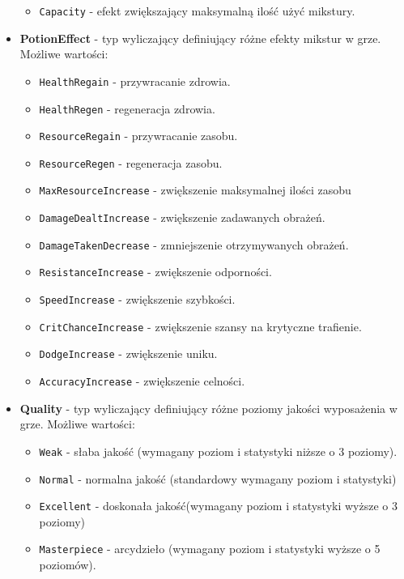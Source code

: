 \begin{itemize}
\begin{itemize}
                \item \texttt{Capacity} - efekt zwiększający maksymalną ilość użyć mikstury.
            \end{itemize}
        \item \textbf{PotionEffect} - typ wyliczający definiujący różne efekty mikstur w grze. 
        Możliwe wartości:
            \begin{itemize}
                \item \texttt{HealthRegain} - przywracanie zdrowia.
                \item \texttt{HealthRegen} - regeneracja zdrowia.
                \item \texttt{ResourceRegain} - przywracanie zasobu.
                \item \texttt{ResourceRegen} - regeneracja zasobu.
                \item \texttt{MaxResourceIncrease} - zwiększenie maksymalnej ilości zasobu
                \item \texttt{DamageDealtIncrease} - zwiększenie zadawanych obrażeń.
                \item \texttt{DamageTakenDecrease} - zmniejszenie otrzymywanych obrażeń.
                \item \texttt{ResistanceIncrease} - zwiększenie odporności.
                \item \texttt{SpeedIncrease} - zwiększenie szybkości.
                \item \texttt{CritChanceIncrease} - zwiększenie szansy na krytyczne trafienie.
                \item \texttt{DodgeIncrease} - zwiększenie uniku.
                \item \texttt{AccuracyIncrease} - zwiększenie celności.
            \end{itemize}
        \item \textbf{Quality} - typ wyliczający definiujący różne poziomy jakości wyposażenia w grze. 
        Możliwe wartości:
            \begin{itemize}
                \item \texttt{Weak} - słaba jakość (wymagany poziom i statystyki niższe o 3 poziomy).
                \item \texttt{Normal} - normalna jakość (standardowy wymagany poziom i statystyki)
                \item \texttt{Excellent} - doskonała jakość(wymagany poziom i statystyki wyższe o 3 poziomy)
                \item \texttt{Masterpiece} - arcydzieło (wymagany poziom i statystyki wyższe o 5 poziomów).

\end{itemize}
\end{itemize}
